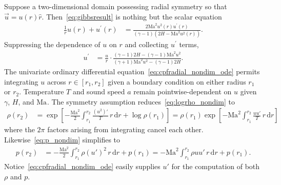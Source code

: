 \documentclass[letterpaper,11pt,nointlimits,reqno]{amsart}
\newcommand{\Mach}[1][]{\mbox{Ma}_{#1}}
\begin{document}
Suppose a two-dimensional domain possessing radial symmetry so that
$\vec{u}={u}\!\left(r\right)\hat{r}$. Then~\eqref{eq:gibbsresult} is nothing
but the scalar equation
\begin{align}
  \frac{1}{r}u\!\left(r\right) + u^\prime\!\left(r\right)
  &= \frac{2 \Mach^2 u^2\!\left(r\right) u^\prime\!\left(r\right)}
          {\left(\gamma-1\right)\left(2H - \Mach^2 u^2\!\left(r\right)\right)}.
\end{align}
Suppressing the dependence of $u$ on $r$ and collecting $u^\prime$ terms,
\begin{align}
  u^\prime
  &=
  \frac{u}{r}
  \cdot
  \frac{\left(\gamma-1\right)2H - \left(\gamma-1\right)\Mach^2 u^2}
       {\left(\gamma+1\right)\Mach^2 u^2 - \left(\gamma-1\right)2H}
  \label{eq:cpfradial_nondim_ode}.
\end{align}
The univariate ordinary differential equation~\eqref{eq:cpfradial_nondim_ode}
permits integrating $u$ across $r\in\left[r_1, r_2\right]$ given a boundary
condition on either radius $r_1$ or $r_2$.  Temperature $T$ and sound speed $a$
remain pointwise-dependent on $u$ given $\gamma$, $H$, and $\Mach$. The
symmetry assumption reduces~\eqref{eq:logrho_nondim} to
\begin{align}
  \rho\!\left(r_2\right)
  &=
  \exp\left[
    - \frac{\Mach^2}{2} \int_{r_1}^{r_2}
        \frac{\left(u^2\right)'}{T}
      \, r \, \mathrm{d}r
    + \log\rho\!\left(r_1\right)
  \right]
   =
  \rho\!\left(r_1\right) \exp\left[
    - \Mach^2 \int_{r_1}^{r_2}
        \frac{u u'}{T}
      \, r \, \mathrm{d}r
  \right]
\label{eq:cpfradial_nondim_rho}
\end{align}
where the $2\pi$ factors arising from integrating cancel each other.
Likewise~\eqref{eq:p_nondim} simplifies to
\begin{align}
  p\!\left(r_2\right)
  &=
    - \frac{\Mach^2}{2} \int_{r_1}^{r_2}
        \rho \left(u'\right)^2
      \, r \, \mathrm{d}r
    + p\!\left(r_1\right)
   =
    -\Mach^2 \int_{r_1}^{r_2} \rho u u' \, r \, \mathrm{d}r
      + p\!\left(r_1\right)
\label{eq:cpfradial_nondim_p}.
\end{align}
Notice~\eqref{eq:cpfradial_nondim_ode} easily supplies $u'$ for the computation
of both $\rho$ and $p$.
\end{document}
